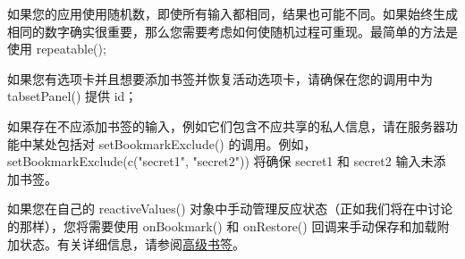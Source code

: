 如果您的应用使用随机数，即使所有输入都相同，结果也可能不同。如果始终生成相同的数字确实很重要，那么您需要考虑如何使随机过程可重现。最简单的方法是使用 repeatable();

如果您有选项卡并且想要添加书签并恢复活动选项卡，请确保在您的调用中为 tabsetPanel() 提供 id；

如果存在不应添加书签的输入，例如它们包含不应共享的私人信息，请在服务器功能中某处包括对 setBookmarkExclude() 的调用。例如，setBookmarkExclude(c("secret1", "secret2")) 将确保 secret1 和 secret2 输入未添加书签。

如果您在自己的 reactiveValues() 对象中手动管理反应状态（正如我们将在中讨论的那样），您将需要使用 onBookmark() 和 onRestore() 回调来手动保存和加载附加状态。有关详细信息，请参阅\href{https://shiny.posit.co/r/articles/share/advanced-bookmarking/}{高级书签}。